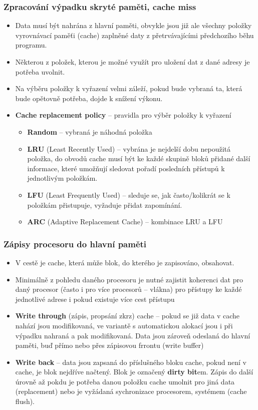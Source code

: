 \documentclass{beamer}
\begin{document}
\begin{frame}
\frametitle{Zpracování výpadku skryté paměti, cache miss}

\begin{itemize}
\item Data musí být nahrána z hlavní paměti, obvykle jsou již ale všechny položky vyrovnávací paměťi (cache) zaplněné daty z přetrvávajícími předchozího běhu programu.
\item Některou z položek, kterou je možné využít pro uložení dat z dané adresy je potřeba uvolnit.
\item Na výběru položky k vyřazení velmi záleží, pokud bude vybraná ta, která bude opětovně potřeba, dojde k snížení výkonu.
\item \textbf{Cache replacement policy} -- pravidla pro výběr položky k vyřazení
\begin{itemize}
\item \textbf{Random} -- vybraná je náhodná položka
\item \textbf{LRU} (Least Recently Used) -- vybrána je nejdelší dobu nepoužitá položka, do obvodů cache musí být ke každé skupině bloků přidané další informace, které umožňují sledovat pořadí posledních přístupů k jednotlivým položkám.
\item \textbf{LFU} (Least Frequently Used) -- sleduje se, jak často/kolikrát se k položkám přistupuje, vyžaduje přidat zapomínání.
\item \textbf{ARC} (Adaptive Replacement Cache) – kombinace LRU a LFU
\end{itemize}
\end{itemize}

\end{frame}

\begin{frame}
\frametitle{Zápisy procesoru do hlavní paměti}

\begin{itemize}
\item V cestě je cache, která může blok, do kterého je zapisováno, obsahovat.
\item Minimálně z pohledu daného procesoru je nutné zajistit koherenci dat pro daný procesor (často i pro více procesorů -- vlákna) pro přístupy ke každé jednotlivé adrese i pokud existuje více cest přístupu 
\item \textbf{Write through} (zápis, propsání zkrz) cache -- pokud se již data v cache nahází jsou modifikovaná, ve variantě s automatickou alokací jsou i při výpadku nahraná a pak modifikovaná. Data jsou zároveň odeslaná do hlavní paměti, buď přímo nebo přes zápisovou frrontu (write buffer)
\item \textbf{Write back} -- data jsou zapsaná do příslušného bloku cache, pokud není v cache, je blok nejdříve načtený. Blok je označený \textbf{dirty bit}em. Zápis do další úrovně až pokdu je potřeba danou položku cache umolnit pro jiná data (replacement) nebo je vyžádaná sychronizace procesorem, systémem (cache flush).
\end{itemize}

\end{frame}
\end{document}
